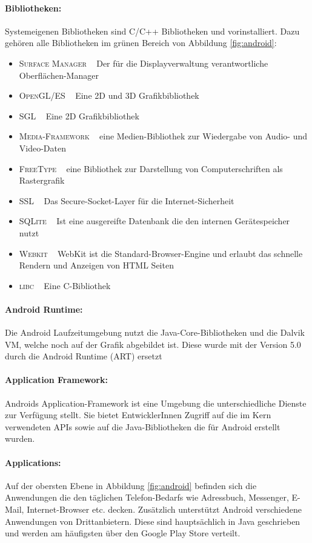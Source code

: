 \paragraph{Bibliotheken: }
Systemeigenen Bibliotheken sind C/C++ Bibliotheken und vorinstalliert. Dazu gehören alle Bibliotheken im grünen Bereich von Abbildung \ref{fig:android}:
\begin{itemize}[leftmargin=0.7cm]
\renewcommand\labelitemi{--}
	\item \textsc{Surface Manager} ~ Der für die Displayverwaltung verantwortliche Oberflächen-Manager
	\item \textsc{OpenGL/ES} ~ Eine 2D und 3D Grafikbibliothek
	\item \textsc{SGL} ~ Eine 2D Grafikbibliothek
 	\item \textsc{Media-Framework} ~ eine Medien-Bibliothek zur Wiedergabe von Audio- und Video-Daten 	
 	\item \textsc{FreeType} ~ eine Bibliothek zur Darstellung von Computerschriften als Rastergrafik
 	\item \textsc{SSL} ~ Das Secure-Socket-Layer für die Internet-Sicherheit
	\item \textsc{SQLite} ~ Ist eine ausgereifte Datenbank die den internen Gerätespeicher nutzt 
	\item \textsc{Webkit} ~ WebKit ist die Standard-Browser-Engine und erlaubt das schnelle Rendern und Anzeigen von HTML Seiten
	\item \textsc{libc} ~ Eine C-Bibliothek
\end{itemize}
\paragraph{Android Runtime: }
Die Android Laufzeitumgebung nutzt die Java-Core-Bibliotheken und die Dalvik \gls{VM}, welche noch auf der Grafik abgebildet ist. Diese wurde mit der Version 5.0 durch die Android Runtime (ART) ersetzt\cite{android_5}
\paragraph{Application Framework: }
Androids Application-Framework ist eine Umgebung die unterschiedliche Dienste zur Verfügung stellt. Sie bietet EntwicklerInnen Zugriff auf die im Kern verwendeten \glspl{API} sowie auf die Java-Bibliotheken die für Android erstellt wurden. 
\paragraph{Applications: }
Auf der obersten Ebene in Abbildung \ref{fig:android} befinden sich die Anwendungen die den täglichen Telefon-Bedarfs wie Adressbuch, Messenger, E-Mail, Internet-Browser etc. decken. Zusätzlich unterstützt Android verschiedene Anwendungen von Drittanbietern. Diese sind hauptsächlich in Java geschrieben und werden am häufigsten über den Google Play Store verteilt.
